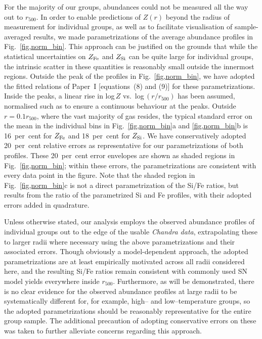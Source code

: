 \documentclass[useAMS,usenatbib]{mn2e}
\begin{document}
For the majority of our groups, abundances could not be measured all
the way out to $r_{500}$.  In order to enable predictions of $Z(r)$
beyond the radius of measurement for individual groups, as well as to
facilitate visualisation of sample-averaged results, we made
parametrizations of the average abundance profiles in
Fig.~\ref{fig,norm_bin}.  This approach can be justified on the
grounds that while the statistical uncertainties on $Z_{\rm Fe}$ and
$Z_{\rm Si}$ can be quite large for individual groups, the intrinsic
scatter in these quantities is reasonably small outside the innermost
regions. Outside the peak of the profiles in Fig.~\ref{fig,norm_bin},
we have adopted the fitted relations of Paper~I [equations~(8) and
(9)] for these parametrizations. Inside the peaks, a linear rise in
log\,$Z$ vs.\ log\,$(r/r_{500})$ has been assumed, normalised such as
to ensure a continuous behaviour at the peaks. Outside $r=0.1r_{500}$,
where the vast majority of gas resides, the typical standard error on
the mean in the individual bins in Fig.~\ref{fig,norm_bin}a and
\ref{fig,norm_bin}b is 16~per~cent for $Z_{\rm Fe}$ and 18~per~cent
for $Z_{\rm Si}$. We have conservatively adopted 20~per~cent relative
errors as representative for our parametrizations of both
profiles. These 20~per~cent error envelopes are shown as shaded
regions in Fig.~\ref{fig,norm_bin}; within these errors, the
parametrizations are consistent with every data point in the figure.
Note that the shaded region in Fig.~\ref{fig,norm_bin}c is not a
direct parametrization of the Si/Fe ratios, but results from the ratio
of the parametrized Si and Fe profiles, with their adopted errors
added in quadrature.

Unless otherwise stated, our analysis employs the observed abundance
profiles of individual groups out to the edge of the usable {\em
Chandra data}, extrapolating these to larger radii where necessary
using the above parametrizations and their associated errors. Though
obviously a model-dependent approach, the adopted parametrizations are
at least empirically motivated across all radii considered here, and
the resulting Si/Fe ratios remain consistent with commonly used SN
model yields everywhere inside $r_{500}$. Furthermore, as will be
demonstrated, there is no clear evidence for the observed abundance
profiles at large radii to be systematically different for, for
example, high-- and low--temperature groups, so the adopted
parametrizations should be reasonably representative for the entire
group sample.  The additional precaution of adopting conservative
errors on these was taken to further alleviate concerns regarding this
approach.
\end{document}
